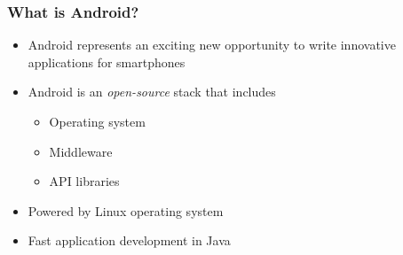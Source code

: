 %
%

\begin{frame}
  \frametitle{What is Android?}
  
  \begin{itemize}
    
  \item<1-> Android represents an exciting new opportunity to write
    innovative applications for smartphones
  \item<2-> Android is an \emph{open-source} stack that includes
    \begin{itemize}
    \item<2-> Operating system
    \item<2-> Middleware
    \item<2-> API libraries
    \end{itemize}
    
  \item<3-> Powered by Linux operating system

  \item<4-> Fast application development in Java

  \end{itemize}

\end{frame}



